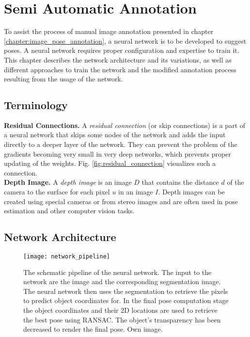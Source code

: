 \chapter{Semi Automatic Annotation} \label{chapter:semi_automatic}

To assist the process of manual image annotation presented in chapter \ref{chapter:image_pose_annotation}, a neural network is to be developed to suggest poses. A neural network requires proper configuration and expertise to train it. This chapter describes the network architecture and its variations, as well as different approaches to train the network and the modified annotation process resulting from the usage of the network.

\section{Terminology}

\noindent\textbf{Residual Connections.} A \textit{residual connection} (or skip connections) is a part of a neural network that skips some nodes of the network and adds the input directly to a deeper layer of the network. They can prevent the problem of the gradients becoming very small in very deep networks, which prevents proper updating of the weights. Fig. \ref{fig:residual_connection} visualizes such a connection. \\

\noindent\textbf{Depth Image.} A \textit{depth image} is an image $D$ that contains the distance $d$ of the camera to the surface for each pixel $u$ in an image $I$. Depth images can be created using special cameras or from stereo images and are often used in pose estimation and other computer vision tasks.

\section{Network Architecture}

\begin{figure}[!tbp]
	\centering
    \texttt{[image: network\_pipeline]}
    \caption{The schematic pipeline of the neural network. The input to the network are the image and the corresponding segmentation image. The neural network then uses the segmentation to retrieve the pixels to predict object coordinates for. In the final pose computation stage the object coordinates and their 2D locations are used to retrieve the best pose using RANSAC. The object's transparency has been decreased to render the final pose. Own image.}
    	\label{fig:network_pipeline}
\end{figure} 


